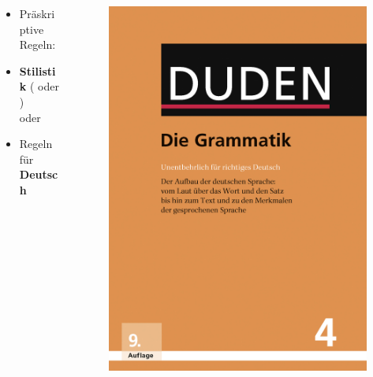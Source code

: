 \begin{frame}

\begin{columns}
\begin{column}{.5\textwidth}

\begin{itemize}
	\item Präskriptive Regeln:
	
	\item[] \textbf{Stilistik} ( oder )\\
	oder\\
	
	\item[] Regeln für  \textbf{Deutsch}
\end{itemize}

\pause 

\end{column}
\begin{column}{.5\textwidth}

\begin{figure}
	\centering
	\includegraphics[scale=.4]{material/DudenRichtigesDeutsch}
\end{figure}

\end{column}

\end{columns}
	
\end{frame}


